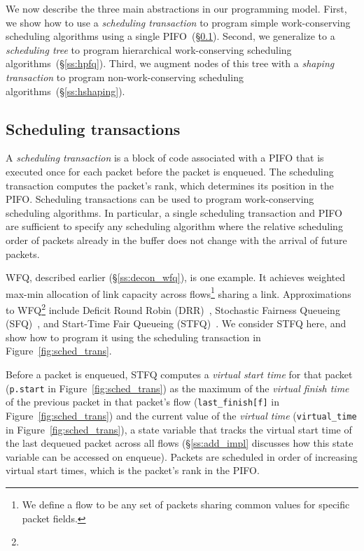 We now describe the three main abstractions in our programming model. First, we
show how to use a {\em scheduling transaction} to program simple
work-conserving scheduling algorithms using a single PIFO~(\S\ref{ss:wfq}).
Second, we generalize to a {\em scheduling tree} to program hierarchical
work-conserving scheduling algorithms~(\S\ref{ss:hpfq}). Third, we augment
nodes of this tree with a {\em shaping transaction} to program
non-work-conserving scheduling algorithms~(\S\ref{ss:hshaping}).

\subsection{Scheduling transactions}
\label{ss:wfq}

A {\em scheduling transaction} is a block of code associated with a PIFO that
is executed once for each packet before the packet is enqueued. The scheduling
transaction computes the packet's rank, which determines its position in the
PIFO. Scheduling transactions can be used to program work-conserving scheduling
algorithms. In particular, a single scheduling transaction and PIFO are
sufficient to specify any scheduling algorithm where the relative scheduling
order of packets already in the buffer does not change with the arrival of
future packets.

WFQ, described earlier (\S\ref{ss:decon_wfq}), is one example. It achieves
weighted max-min allocation of link capacity across flows\footnote{We define a
flow to be any set of packets sharing common values for specific packet
fields.} sharing a link.  Approximations to WFQ\footnote{} include Deficit Round Robin (DRR)~\cite{drr}, Stochastic
Fairness Queueing (SFQ)~\cite{sfq}, and Start-Time Fair Queueing
(STFQ)~\cite{stfq}. We consider STFQ here, and show how to program it using the
scheduling transaction in Figure~\ref{fig:sched_trans}.



Before a packet is enqueued, STFQ computes a {\em virtual start time}
for that packet (\texttt{p.start} in Figure~\ref{fig:sched_trans}) as
the maximum of the {\em virtual finish time} of the previous packet in
that packet's flow (\texttt{last\_finish[f]} in
Figure~\ref{fig:sched_trans}) and the current value of the {\em
  virtual time} (\texttt{virtual\_time} in Figure~\ref{fig:sched_trans}), a state variable that tracks the virtual
start time of the last dequeued packet across all flows
(\S\ref{ss:add_impl} discusses how this state variable can be accessed
on enqueue). Packets are scheduled in order of increasing virtual
start times, which is the packet's rank in the PIFO.

